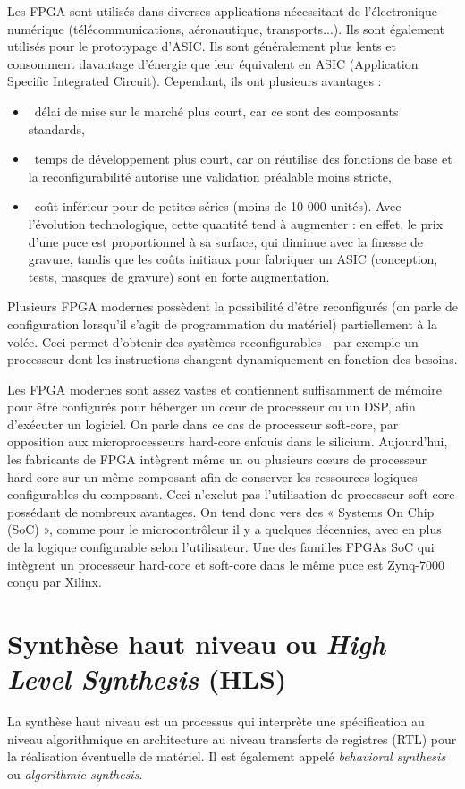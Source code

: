 Les FPGA sont utilisés dans diverses applications nécessitant de l'électronique numérique (télécommunications, aéronautique, transports...).
Ils sont également utilisés pour le prototypage d'ASIC.
Ils sont généralement plus lents et consomment davantage d'énergie 
que leur équivalent en ASIC (Application Specific Integrated Circuit). Cependant, ils ont plusieurs avantages :
\begin{itemize}
    \item\ délai de mise sur le marché plus court, car ce sont des composants standards,
    \item\ temps de développement plus court, car on réutilise des fonctions de base et 
	    la reconfigurabilité autorise une validation préalable moins stricte,
    \item\ coût inférieur pour de petites séries (moins de 10 000 unités). 
	Avec l'évolution technologique, cette quantité tend à augmenter : en effet, le prix d'une puce est 
	proportionnel à sa surface, qui diminue avec la finesse de gravure, tandis que les coûts initiaux 
	pour fabriquer un ASIC (conception, tests, masques de gravure) sont en forte augmentation.
\end{itemize}

Plusieurs FPGA modernes possèdent la possibilité d'être reconfigurés 
(on parle de configuration lorsqu'il s'agit de programmation du matériel) partiellement à la volée. 
Ceci permet d'obtenir des systèmes reconfigurables - par exemple un processeur dont 
les instructions changent dynamiquement en fonction des besoins.

Les FPGA modernes sont assez vastes et contiennent suffisamment de mémoire pour être configurés 
pour héberger un cœur de processeur ou un DSP, afin d'exécuter un logiciel. 
On parle dans ce cas de processeur soft-core, par opposition aux microprocesseurs hard-core enfouis dans le silicium. 
Aujourd'hui, les fabricants de FPGA intègrent même un ou plusieurs cœurs de processeur hard-core 
sur un même composant afin de conserver les ressources logiques configurables du composant. 
Ceci n'exclut pas l'utilisation de processeur soft-core possédant de nombreux avantages. 
On tend donc vers des « Systems On Chip (SoC) », comme pour le microcontrôleur il y a quelques décennies, 
avec en plus de la logique configurable selon l'utilisateur. Une des familles FPGAs SoC
qui intègrent un processeur hard-core et soft-core dans le même puce est Zynq-7000\cite{ug585} conçu par Xilinx.

\section{Synthèse haut niveau ou \emph{High Level Synthesis} (HLS)}
\label{sec:hls}
La synthèse haut niveau est un processus qui interprète une spécification au niveau algorithmique en architecture
au niveau transferts de registres (RTL) pour la réalisation éventuelle de matériel\cite{Vijay1996}.
Il est également appelé \emph{behavioral synthesis} ou \emph{algorithmic synthesis}.

